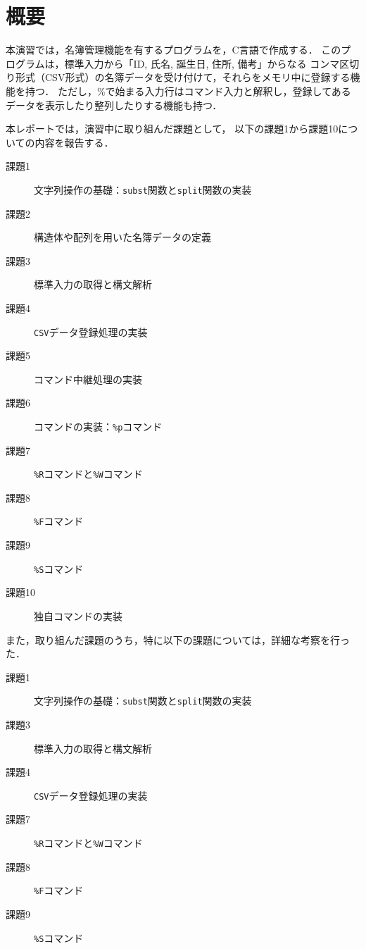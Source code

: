 \section{概要} \label{sec:abstract}

本演習では，名簿管理機能を有するプログラムを，C言語で作成する．
このプログラムは，標準入力から「ID, 氏名, 誕生日, 住所, 備考」からなる
コンマ区切り形式（CSV形式）の名簿データを受け付けて，それらをメモリ中に登録する機能を持つ．
ただし，\%で始まる入力行はコマンド入力と解釈し，登録してあるデータを表示したり整列したりする機能も持つ．

本レポートでは，演習中に取り組んだ課題として，
以下の課題1から課題10についての内容を報告する．
%
\begin{description}
  \item[課題1] 文字列操作の基礎：\verb|subst|関数と\verb|split|関数の実装
  \item[課題2] 構造体や配列を用いた名簿データの定義
  \item[課題3] 標準入力の取得と構文解析
  \item[課題4] \verb|CSV|データ登録処理の実装
  \item[課題5] コマンド中継処理の実装
  \item[課題6] コマンドの実装：\verb|%p|コマンド
  \item[課題7] \verb|%R|コマンドと\verb|%W|コマンド
  \item[課題8] \verb|%F|コマンド
  \item[課題9] \verb|%S|コマンド
  \item[課題10] 独自コマンドの実装
\end{description}
%
また，取り組んだ課題のうち，特に以下の課題については，詳細な考察を行った．
%
\begin{description}
  \item[課題1] 文字列操作の基礎：\verb|subst|関数と\verb|split|関数の実装
  \item[課題3] 標準入力の取得と構文解析
  \item[課題4] \verb|CSV|データ登録処理の実装
  \item[課題7] \verb|%R|コマンドと\verb|%W|コマンド
  \item[課題8] \verb|%F|コマンド
  \item[課題9] \verb|%S|コマンド
\end{description}


